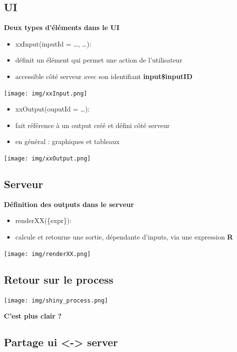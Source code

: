 \documentclass[
]{article}
\begin{document}
\hypertarget{ui}{%
\subsection{UI}\label{ui}}

\textbf{Deux types d'éléments dans le UI}

\begin{itemize}
\item
  xxInput(inputId = \ldots, \ldots):
\item
  définit un élément qui permet une action de l'utilisateur
\item
  accessible côté serveur avec son identifiant \textbf{input\$inputID}
\end{itemize}

\texttt{[image: img/xxInput.png]}

\begin{itemize}
\item
  xxOutput(ouputId = \ldots):
\item
  fait référence à un output créé et défini côté serveur
\item
  en général : graphiques et tableaux
\end{itemize}

\texttt{[image: img/xxOutput.png]}

\hypertarget{serveur}{%
\subsection{Serveur}\label{serveur}}

\textbf{Définition des outputs dans le serveur}

\begin{itemize}
\item
  renderXX(\{expr\}):
\item
  calcule et retourne une sortie, dépendante d'inputs, via une
  expression \textbf{R}
\end{itemize}

\texttt{[image: img/renderXX.png]}

\hypertarget{retour-sur-le-process}{%
\subsection{Retour sur le process}\label{retour-sur-le-process}}

\texttt{[image: img/shiny\_process.png]}

\textbf{C'est plus clair ?}

\hypertarget{partage-ui---server}{%
\subsection{Partage ui \textless-\textgreater{}
server}\label{partage-ui---server}}
\end{document}
